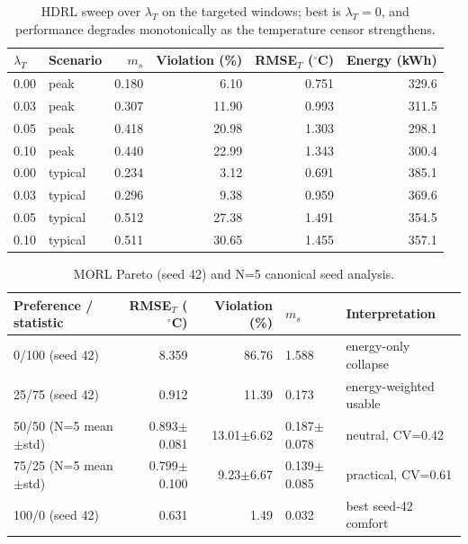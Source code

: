 \documentclass[11pt,a4paper]{article}
\begin{document}
\begin{table}[H]
\centering
\caption{HDRL sweep over $\lambda_T$ on the targeted windows; best is $\lambda_T=0$, and performance degrades monotonically as the temperature censor strengthens.}
\label{tab:hdrl}
\small
\begin{tabular}{llrrrr}
\toprule
$\lambda_T$ & Scenario & $m_s$ & Violation (\%) & RMSE$_T$ ($^\circ$C) & Energy (kWh) \\
\midrule
0.00 & peak & 0.180 & 6.10 & 0.751 & 329.6 \\
0.03 & peak & 0.307 & 11.90 & 0.993 & 311.5 \\
0.05 & peak & 0.418 & 20.98 & 1.303 & 298.1 \\
0.10 & peak & 0.440 & 22.99 & 1.343 & 300.4 \\
0.00 & typical & 0.234 & 3.12 & 0.691 & 385.1 \\
0.03 & typical & 0.296 & 9.38 & 0.959 & 369.6 \\
0.05 & typical & 0.512 & 27.38 & 1.491 & 354.5 \\
0.10 & typical & 0.511 & 30.65 & 1.455 & 357.1 \\
\bottomrule
\end{tabular}
\end{table}
\begin{table}[H]
\centering
\caption{MORL Pareto (seed 42) and N=5 canonical seed analysis.}
\label{tab:morl_pareto_seed}
\small
\begin{tabular}{lrrll}
\toprule
Preference / statistic & RMSE$_T$ ($^\circ$C) & Violation (\%) & $m_s$ & Interpretation \\
\midrule
0/100 (seed 42) & 8.359 & 86.76 & 1.588 & energy-only collapse \\
25/75 (seed 42) & 0.912 & 11.39 & 0.173 & energy-weighted usable \\
50/50 (N=5 mean$\pm$std) & 0.893$\pm$0.081 & 13.01$\pm$6.62 & 0.187$\pm$0.078 & neutral, CV=0.42 \\
75/25 (N=5 mean$\pm$std) & 0.799$\pm$0.100 & 9.23$\pm$6.67 & 0.139$\pm$0.085 & practical, CV=0.61 \\
100/0 (seed 42) & 0.631 & 1.49 & 0.032 & best seed-42 comfort \\
\bottomrule
\end{tabular}
\end{table}
\end{document}

